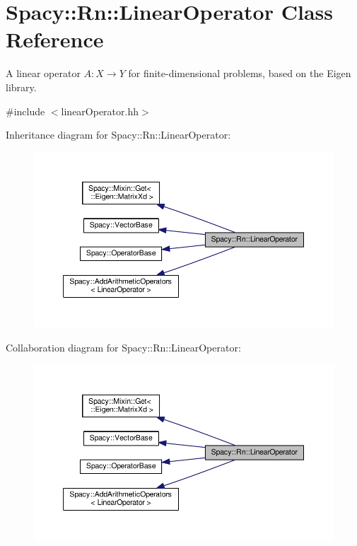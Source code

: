 \hypertarget{classSpacy_1_1Rn_1_1LinearOperator}{}\section{Spacy\+:\+:Rn\+:\+:Linear\+Operator Class Reference}
\label{classSpacy_1_1Rn_1_1LinearOperator}


A linear operator $A:X\rightarrow Y$ for finite-\/dimensional problems, based on the Eigen library.  




{\ttfamily \#include $<$linear\+Operator.\+hh$>$}



Inheritance diagram for Spacy\+:\+:Rn\+:\+:Linear\+Operator\+:
\nopagebreak
\begin{figure}[H]
\begin{center}
\leavevmode
\includegraphics[width=350pt]{classSpacy_1_1Rn_1_1LinearOperator__inherit__graph}
\end{center}
\end{figure}


Collaboration diagram for Spacy\+:\+:Rn\+:\+:Linear\+Operator\+:
\nopagebreak
\begin{figure}[H]
\begin{center}
\leavevmode
\includegraphics[width=350pt]{classSpacy_1_1Rn_1_1LinearOperator__coll__graph}
\end{center}
\end{figure}
